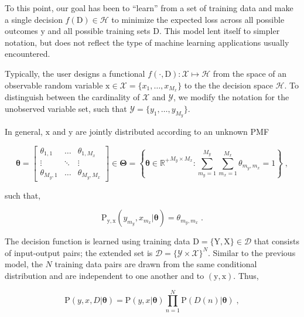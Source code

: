 \documentclass[12pt]{article}
\begin{document}
To this point, our goal has been to ``learn'' from a set of training data and make a single decision $f(\mathrm{D}) \in \mathcal{H}$ to minimize the expected loss across all possible outcomes $\mathrm{y}$ and all possible training sets $\mathrm{D}$. This model lent itself to simpler notation, but does not reflect the type of machine learning applications usually encountered. 

Typically, the user designs a functional $f(\cdot,\mathrm{D}): \mathcal{X} \mapsto \mathcal{H}$ from the space of an observable random variable $\mathrm{x} \in \mathcal{X} = \{x_1,\ldots,x_{M_x}\}$ to the the decision space $\mathcal{H}$. To distinguish between the cardinality of $\mathcal{X}$ and $\mathcal{Y}$, we modify the notation for the unobserved variable set, such that $\mathcal{Y} = \{y_1,\ldots,y_{M_y}\}$. 

In general, $\mathrm{x}$ and $\mathrm{y}$ are jointly distributed according to an unknown PMF

\begin{equation}
\bm{\theta} = \begin{bmatrix} \theta_{1,1} & \ldots & \theta_{1,M_x} \\ \vdots & \ddots & \vdots \\ \theta_{M_y,1} & \ldots & \theta_{M_y,M_x} \end{bmatrix} 
\in \bm{\Theta} = \left\{ \bm{\theta} \in {\mathbb{R}^+}^{M_y \times M_x}: \sum_{m_y=1}^{M_y} \sum_{m_x=1}^{M_x}  \theta_{m_y,m_x} = 1 \right\} \;,
\end{equation}

such that,

\begin{equation}
\text{P}_{\mathrm{y},\mathrm{x}}(y_{m_y},x_{m_x} | \bm{\theta}) = \theta_{m_y,m_x} \;.
\end{equation}

The decision function is learned using training data $\mathrm{D} = \{ \mathrm{Y},\mathrm{X} \} \in \mathcal{D}$ that consists of input-output pairs; the extended set is $\mathcal{D} = \{\mathcal{Y} \times \mathcal{X}\}^N$. Similar to the previous model, the $N$ training data pairs are drawn from the same conditional distribution and are independent to one another and to $(\mathrm{y},\mathrm{x})$. Thus,

\begin{equation}
\text{P}(y,x,D | \bm{\theta}) = \text{P}(y,x | \bm{\theta}) \prod_{n=1}^N \text{P}(D(n) | \bm{\theta}) \;,
\end{equation}
\end{document}
